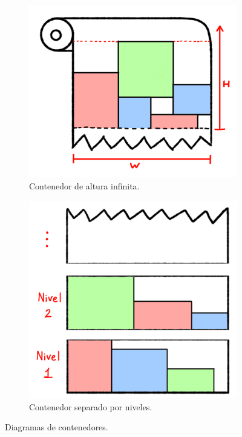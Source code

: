 \documentclass[letter, 10pt]{article}
\begin{document}
\begin{figure}[h]
    \centering
    \begin{subfigure}[b]{0.45\textwidth}
        \includegraphics[width=\textwidth]{./img/rollo.png}
        \caption{Contenedor de altura infinita.}
        \label{fig:rollo}
    \end{subfigure}
    \hfill
    \begin{subfigure}[b]{0.45\textwidth}
        \includegraphics[width=\textwidth]{./img/niveles.png}
        \caption{Contenedor separado por niveles.}
        \label{fig:niveles}
    \end{subfigure}
    \caption{Diagramas de contenedores.}
    \label{fig:diagr}
\end{figure}
\end{document}
